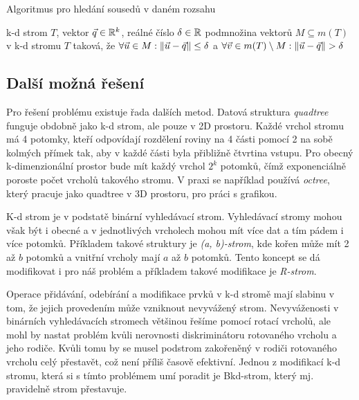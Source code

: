 \begin{algorithm}
  \label{algo:kd-tree-range-search}
  \caption{Algoritmus pro hledání sousedů v daném rozsahu}
  \begin{algorithmic}
    \Require k-d strom $T$, vektor $\vec{q} \in \mathbb{R}^k$, reálné číslo $\delta \in \mathbb{R}$
    \Ensure podmnožina vektorů $M \subseteq m(T)$ v k-d stromu $T$ taková, že $\forall \vec{u} \in M: \|\vec{u} - \vec{q}\| \leq \delta$ a $\forall \vec{v} \in m(T) \setminus M: \|\vec{u} - \vec{q}\| > \delta$
    
  \end{algorithmic}
\end{algorithm}

\subsection{Další možná řešení}

Pro řešení problému existuje řada dalších metod. Datová struktura \textit{quadtree} funguje obdobně jako k-d strom, ale pouze v 2D prostoru. Každé vrchol stromu má 4 potomky, kteří odpovídají rozdělení roviny na 4 části pomocí 2 na sobě kolmých přímek tak, aby v každé části byla přibližně čtvrtina vstupu. Pro obecný k-dimenzionální prostor bude mít každý vrchol $2^k$ potomků, čímž exponenciálně poroste počet vrcholů takového stromu. V praxi se například používá \textit{octree}, který pracuje jako quadtree v 3D prostoru, pro práci s grafikou.\cite{octree-usage}

K-d strom je v podstatě binární vyhledávací strom. Vyhledávací stromy mohou však být i obecné a v jednotlivých vrcholech mohou mít více dat a tím pádem i více potomků. Příkladem takové struktury je \textit{(a, b)-strom}, kde kořen může mít 2 až $b$ potomků a vnitřní vrcholy mají $a$ až $b$ potomků.\cite[s.~190--198]{pruvodce} Tento koncept se dá modifikovat i pro náš problém a příkladem takové modifikace je \textit{R-strom}.\cite{r-tree}

Operace přidávání, odebírání a modifikace prvků v k-d stromě mají slabinu v tom, že jejich provedením může vzniknout nevyvážený strom. Nevyváženosti v binárních vyhledávacích stromech většinou řešíme pomocí rotací vrcholů, ale mohl by nastat problém kvůli nerovnosti diskriminátoru rotovaného vrcholu a jeho rodiče. Kvůli tomu by se musel podstrom zakořeněný v rodiči rotovaného vrcholu celý přestavět, což není příliš časově efektivní. Jednou z modifikací k-d stromu, která si s tímto problémem umí poradit je Bkd-strom, který mj. pravidelně strom přestavuje.\cite{bkd-tree}
